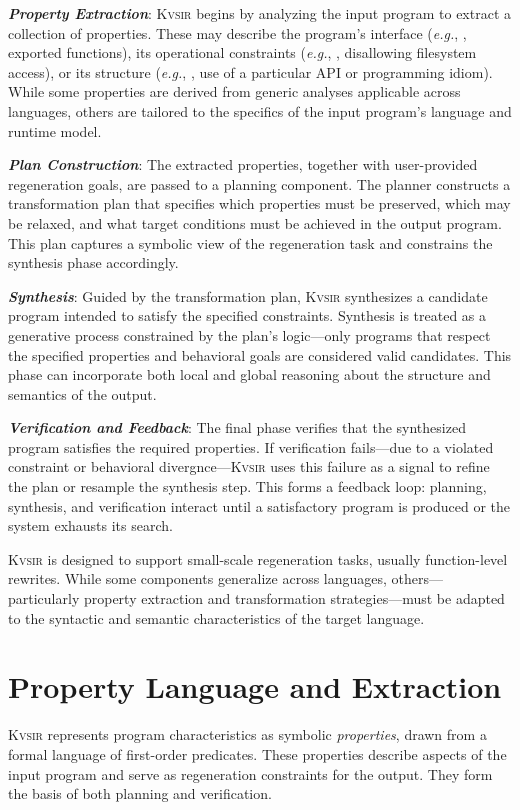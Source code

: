 \documentclass[sigplan]{acmart}
\def\eg{{\em e.g.}, }
\newcommand{\sys}{{\scshape Kv{\textalpha}sir}\xspace}
\newcommand{\heading}[1]{\vspace{2pt}\noindent\textbf{\emph{#1}}:\enspace}
\begin{document}
\heading{Property Extraction} \sys begins by analyzing the input program to
extract a collection of properties. These may describe the program’s interface
(\eg, exported functions), its operational constraints (\eg, disallowing
filesystem access), or its structure (\eg, use of a particular API or
programming idiom). While some properties are derived from generic analyses
applicable across languages, others are tailored to the specifics of the input
program’s language and runtime model.

\heading{Plan Construction} The extracted properties, together with
user-provided regeneration goals, are passed to a planning component. The
planner constructs a transformation plan that specifies which properties must
be preserved, which may be relaxed, and what target conditions must be achieved
in the output program. This plan captures a symbolic view of the regeneration
task and constrains the synthesis phase accordingly.

\heading{Synthesis} Guided by the transformation plan, \sys synthesizes a
candidate program intended to satisfy the specified constraints. Synthesis is
treated as a generative process constrained by the plan’s logic---only programs
that respect the specified properties and behavioral goals are considered valid
candidates. This phase can incorporate both local and global reasoning about
the structure and semantics of the output.

\heading{Verification and Feedback} The final phase verifies that the
synthesized program satisfies the required properties. If verification
fails---due to a violated constraint or behavioral divergnce---\sys uses this
failure as a signal to refine the plan or resample the synthesis step. This
forms a feedback loop: planning, synthesis, and verification interact until a
satisfactory program is produced or the system exhausts its search.

\sys is designed to support small-scale regeneration tasks,
usually function-level rewrites.
While some components generalize across languages, others---particularly
property extraction and transformation strategies---must be adapted to the
syntactic and semantic characteristics of the target language.

\section{Property Language and Extraction}

\sys represents program characteristics as symbolic \emph{properties}, drawn from a formal language of first-order predicates. These properties describe aspects of the input program and serve as regeneration constraints for the output. They form the basis of both planning and verification.
\end{document}
